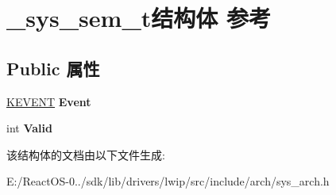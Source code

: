 \hypertarget{struct__sys__sem__t}{}\section{\+\_\+sys\+\_\+sem\+\_\+t结构体 参考}
\label{struct__sys__sem__t}
\subsection*{Public 属性}
\begin{DoxyCompactItemize}
\item 
\mbox{\label{struct__sys__sem__t_a184b8a2101c0f234cf80aa53ee4eb8f5}} 
\hyperlink{struct___k_e_v_e_n_t}{K\+E\+V\+E\+NT} {\bfseries Event}
\item 
\mbox{\label{struct__sys__sem__t_ae3ecaa114de860bb664380909463c3cb}} 
int {\bfseries Valid}
\end{DoxyCompactItemize}


该结构体的文档由以下文件生成\+:\begin{DoxyCompactItemize}
\item 
E\+:/\+React\+O\+S-\/0../sdk/lib/drivers/lwip/src/include/arch/sys\+\_\+arch.\+h\end{DoxyCompactItemize}
